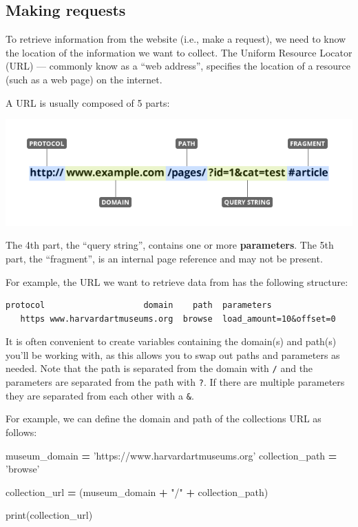 \documentclass[]{book}
\newenvironment{Shaded}{\begin{snugshade}}{\end{snugshade}}
\newcommand{\BuiltInTok}[1]{#1}
\newcommand{\NormalTok}[1]{#1}
\newcommand{\OperatorTok}[1]{\textcolor[rgb]{0.81,0.36,0.00}{\textbf{#1}}}
\newcommand{\StringTok}[1]{\textcolor[rgb]{0.31,0.60,0.02}{#1}}
\begin{document}
\hypertarget{making-requests}{%
\subsection{Making requests}\label{making-requests}}

To retrieve information from the website (i.e., make a request), we need to know the location of the information we want to collect. The Uniform Resource Locator (URL) --- commonly know as a ``web address'', specifies the location of a resource (such as a web page) on the internet.

A URL is usually composed of 5 parts:

\includegraphics{Python/PythonWebScrape/images/URL.png}

The 4th part, the ``query string'', contains one or more \textbf{parameters}. The 5th part, the ``fragment'', is an internal page reference and may not be present.

For example, the URL we want to retrieve data from has the following structure:

\begin{verbatim}
protocol                    domain    path  parameters
   https www.harvardartmuseums.org  browse  load_amount=10&offset=0
\end{verbatim}

It is often convenient to create variables containing the domain(s) and path(s) you'll be working with, as this allows you to swap out paths and parameters as needed. Note that the path is separated from the domain with \texttt{/} and the parameters are separated from the path with \texttt{?}. If there are multiple parameters they are separated from each other with a \texttt{\&}.

For example, we can define the domain and path of the collections URL as follows:

\begin{Shaded}
\begin{Highlighting}[]
\NormalTok{museum_domain }\OperatorTok{=} \StringTok{'https://www.harvardartmuseums.org'}
\NormalTok{collection_path }\OperatorTok{=} \StringTok{'browse'}

\NormalTok{collection_url }\OperatorTok{=}\NormalTok{ (museum_domain}
                  \OperatorTok{+} \StringTok{"/"}
                  \OperatorTok{+}\NormalTok{ collection_path)}

\BuiltInTok{print}\NormalTok{(collection_url)}
\end{Highlighting}
\end{Shaded}
\end{document}
